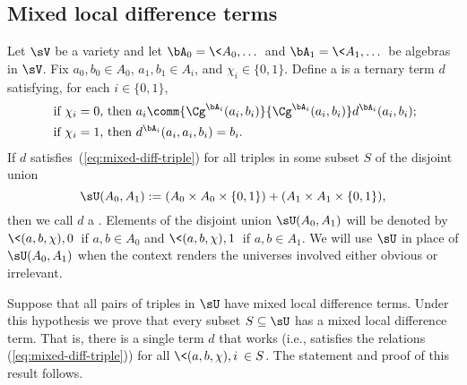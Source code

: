 \subsection{Mixed local difference terms}
\label{sec:mixed-local-diff}
Let $\sV$ be a variety and let $\bA_0=\< A_0, \dots\>$ and  $\bA_1=\< A_1, \dots\>$ be
algebras in $\sV$.  Fix $a_0, b_0 \in A_0$,  $a_1, b_1 \in A_i$,  and
$\chi_i \in \{0,1\}$.
Define a 
is a ternary term $d$ satisfying, for each $i \in \{0,1\}$,
\begin{align}
\text{ if $\chi_i=0$, then } & a_i \comm{\Cg^{\bA_i}(a_i,b_i)}{\Cg^{\bA_i}(a_i,b_i)} d^{\bA_i}(a_i,b_i); \label{eq:mixed-diff-triple}\\
\text{ if $\chi_i=1$, then } &d^{\bA_i}(a_i,a_i,b_i) = b_i. \nonumber
\end{align}
If $d$ satisfies~(\ref{eq:mixed-diff-triple}) for all triples
in some subset $S$ of the disjoint union
\[
\sU(A_0, A_1)  := (A_0 \times A_0 \times \{0,1\}) + (A_1\times A_1 \times \{0,1\}),
\]
then we call $d$ a .
Elements of the disjoint union $\sU(A_0, A_1)$ will be denoted by
$\<(a, b, \chi), 0\>$ if $a, b \in A_0$ and
$\<(a, b, \chi), 1\>$ if $a, b \in A_1$.
We will use $\sU$ in place of $\sU(A_0, A_1)$ when the context renders the
universes involved either obvious or irrelevant.

Suppose that all pairs of triples 
in $\sU$ have mixed local difference terms.
Under this hypothesis we prove that every subset $S\subseteq \sU$
has a mixed local difference term.
That is, there is a single term $d$ that works (i.e., satisfies
the relations (\ref{eq:mixed-diff-triple})) for all $\<(a, b, \chi), i\> \in S$.
The statement and proof of this result follows.


